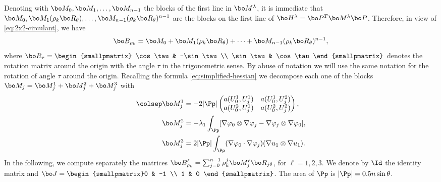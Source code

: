Denoting with $\bo M_0, \bo M_1,\dots, \bo M_{n-1}$ the blocks of the first line in $\bo M^\lambda$, it is immediate that $\bo M_0, \bo M_1(\rho_k \bo R_\theta),\dots, \bo M_{n-1}(\rho_k \bo R_\theta)^{n-1} $ are the blocks on the first line of $\bo H^\lambda = \bo P^T\bo M^\lambda \bo P$. Therefore, in view of \eqref{eq:2x2-circulant}, we have
\[
\bo B_{\rho_k} = \bo M_0+\bo M_1 (\rho_k \bo R_\theta)+\cdots+\bo M_{n-1} (\rho_k \bo R_\theta)^{n-1},
\]
where $\bo R_\tau=\begin{smallpmatrix}
\cos \tau & -\sin \tau \\
\sin \tau & \cos \tau
\end{smallpmatrix}$ denotes the rotation matrix around the origin with the angle $\tau$ in the trigonometric sense. By abuse of notation we will use the same notation for the rotation of angle $\tau$ around the origin. Recalling the formula \eqref{eq:simplified-hessian} we decompose each one of the blocks $\bo M_j = \bo M_j^1+\bo M_j^2+\bo M_j^3$ with
\begin{align*}
\colsep
\bo M_j^1 &= -2|\Pp| \begin{pmatrix}
a(U_0^1,U_j^1) & a(U_0^1,U_j^2) \\
a(U_0^2,U_j^1) & a(U_0^2,U_j^2)
\end{pmatrix},\\
\bo M_j^2 &= -\lambda_1 \int_{\Pp} [\nabla \varphi_0 \otimes \nabla \varphi_j - \nabla \varphi_j \otimes \nabla \varphi_0],
\\
\bo M_j^3 &= 2|\Pp| \int_\Pp (\nabla \varphi_0 \cdot \nabla \varphi_j) (\nabla u_1 \otimes \nabla u_1).
\end{align*}
In the following, we compute separately the matrices $\bo B_{\rho_k}^\ell = \sum_{j=0}^{n-1} \rho_k^j\bo M_j^\ell\bo R_{j\theta}$, for $\ell=1,2,3$. We denote by $\Id$ the identity matrix and $\bo J = \begin{smallpmatrix}0 & -1 \\ 1 & 0
\end{smallpmatrix}$. The area of $\Pp$ is $|\Pp|=0.5n\sin \theta$.

